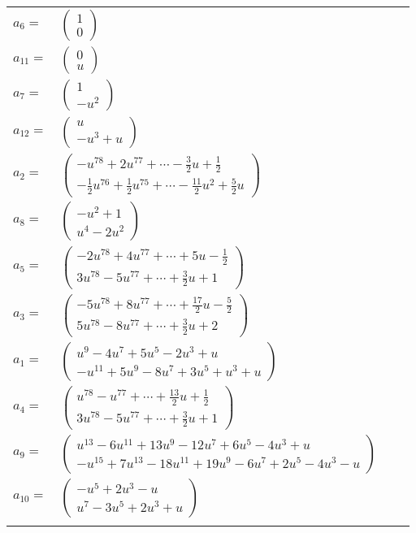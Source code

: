 \documentclass[1p]{elsarticle_modified}
\theoremstyle{definition}
\begin{document}
\begin{tabular}{m{7pt} m{180pt} m{7pt} m{180pt} }
\flushright $a_{6}=$&$\begin{pmatrix}1\\0\end{pmatrix}$ \\
\flushright $a_{11}=$&$\begin{pmatrix}0\\u\end{pmatrix}$ \\
\flushright $a_{7}=$&$\begin{pmatrix}1\\- u^2\end{pmatrix}$ \\
\flushright $a_{12}=$&$\begin{pmatrix}u\\- u^3+u\end{pmatrix}$ \\
\flushright $a_{2}=$&$\begin{pmatrix}- u^{78}+2 u^{77}+\cdots-\frac{3}{2} u+\frac{1}{2}\\-\frac{1}{2} u^{76}+\frac{1}{2} u^{75}+\cdots-\frac{11}{2} u^2+\frac{5}{2} u\end{pmatrix}$ \\
\flushright $a_{8}=$&$\begin{pmatrix}- u^2+1\\u^4-2 u^2\end{pmatrix}$ \\
\flushright $a_{5}=$&$\begin{pmatrix}-2 u^{78}+4 u^{77}+\cdots+5 u-\frac{1}{2}\\3 u^{78}-5 u^{77}+\cdots+\frac{3}{2} u+1\end{pmatrix}$ \\
\flushright $a_{3}=$&$\begin{pmatrix}-5 u^{78}+8 u^{77}+\cdots+\frac{17}{2} u-\frac{5}{2}\\5 u^{78}-8 u^{77}+\cdots+\frac{3}{2} u+2\end{pmatrix}$ \\
\flushright $a_{1}=$&$\begin{pmatrix}u^9-4 u^7+5 u^5-2 u^3+u\\- u^{11}+5 u^9-8 u^7+3 u^5+u^3+u\end{pmatrix}$ \\
\flushright $a_{4}=$&$\begin{pmatrix}u^{78}- u^{77}+\cdots+\frac{13}{2} u+\frac{1}{2}\\3 u^{78}-5 u^{77}+\cdots+\frac{3}{2} u+1\end{pmatrix}$ \\
\flushright $a_{9}=$&$\begin{pmatrix}u^{13}-6 u^{11}+13 u^9-12 u^7+6 u^5-4 u^3+u\\- u^{15}+7 u^{13}-18 u^{11}+19 u^9-6 u^7+2 u^5-4 u^3- u\end{pmatrix}$ \\
\flushright $a_{10}=$&$\begin{pmatrix}- u^5+2 u^3- u\\u^7-3 u^5+2 u^3+u\end{pmatrix}$\\&\end{tabular}
\end{document}
